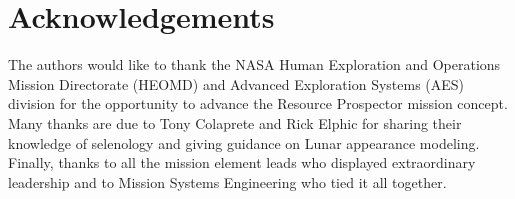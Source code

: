\documentclass[twocolumn,letterpaper]{IEEEAerospaceCLS}  %
\begin{document}
\section{Acknowledgements}
The authors would like to thank the NASA Human Exploration and Operations Mission Directorate (HEOMD) and Advanced Exploration Systems (AES) division for the opportunity to advance the Resource Prospector mission concept.  Many thanks are due to Tony Colaprete and Rick Elphic for sharing their knowledge of selenology and giving guidance on Lunar appearance modeling.  Finally, thanks to all the mission element leads who displayed extraordinary leadership and to Mission Systems Engineering who tied it all together.  




\end{document}
